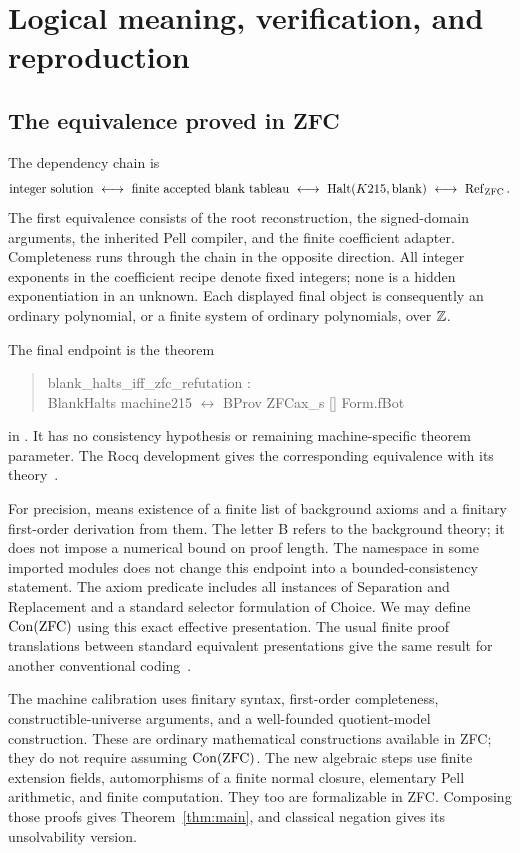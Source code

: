 \section{Logical meaning, verification, and reproduction}\label{sec:logic}

\subsection{The equivalence proved in ZFC}

The dependency chain is
\[
 \text{integer solution}
 \ \longleftrightarrow\ \text{finite accepted blank tableau}
 \ \longleftrightarrow\ \operatorname{Halt}(K215,\mathrm{blank})
 \ \longleftrightarrow\ \operatorname{Ref}_{\mathrm{ZFC}}.
\]
The first equivalence consists of the root reconstruction, the signed-domain
arguments, the inherited Pell compiler, and the finite coefficient adapter.
Completeness runs through the chain in the opposite direction. All integer
exponents in the coefficient recipe denote fixed integers; none is a hidden
exponentiation in an unknown. Each displayed final object is consequently
an ordinary polynomial, or a finite system of ordinary polynomials, over
$\mathbb Z$.

The final endpoint is the theorem
\begin{quote}\small\ttfamily
blank\_halts\_iff\_zfc\_refutation :\\
BlankHalts machine215 $\leftrightarrow$ BProv ZFCax\_s [] Form.fBot
\end{quote}
in . It has no consistency hypothesis or remaining
machine-specific theorem parameter. The Rocq development gives the
corresponding equivalence with its  theory~\cite{endpoint}.

For precision,  means existence of a finite list of background
axioms and a finitary first-order derivation from them. The letter B refers
to the background theory; it does not impose a numerical bound on proof
length. The namespace  in some imported modules
does not change this endpoint into a bounded-consistency statement.
The axiom predicate includes all instances of Separation and Replacement
and a standard selector formulation of Choice. We may define
$\operatorname{Con}(\mathrm{ZFC})$ using this exact effective presentation. The usual
finite proof translations between standard equivalent presentations give
the same result for another conventional coding~\cite{endpoint,t4}.

The machine calibration uses finitary syntax, first-order completeness,
constructible-universe arguments, and a well-founded quotient-model
construction. These are ordinary mathematical constructions available in
ZFC; they do not require assuming $\operatorname{Con}(\mathrm{ZFC})$. The new algebraic
steps use finite extension fields, automorphisms of a finite normal closure,
elementary Pell arithmetic, and finite computation. They too are
formalizable in ZFC. Composing those proofs gives Theorem~\ref{thm:main},
and classical negation gives its unsolvability version.

